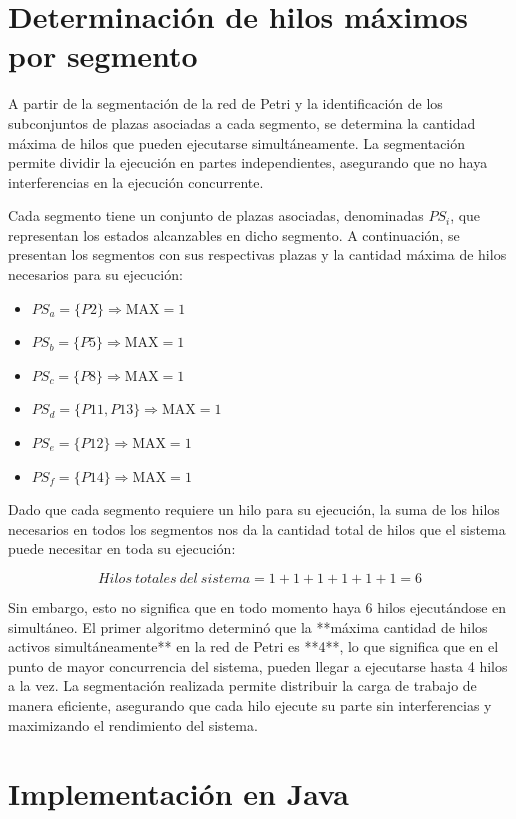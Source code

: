 \documentclass[12pt]{article}
\begin{document}
\section{Determinación de hilos máximos por segmento}

A partir de la segmentación de la red de Petri y la identificación de los subconjuntos de plazas asociadas a cada segmento, se determina la cantidad máxima de hilos que pueden ejecutarse simultáneamente. La segmentación permite dividir la ejecución en partes independientes, asegurando que no haya interferencias en la ejecución concurrente.

Cada segmento tiene un conjunto de plazas asociadas, denominadas \(PS_i\), que representan los estados alcanzables en dicho segmento. A continuación, se presentan los segmentos con sus respectivas plazas y la cantidad máxima de hilos necesarios para su ejecución:

\begin{itemize}
    \item \(PS_a = \{P2\} \Rightarrow \text{MAX} = 1\)
    \item \(PS_b = \{P5\} \Rightarrow \text{MAX} = 1\)
    \item \(PS_c = \{P8\} \Rightarrow \text{MAX} = 1\)
    \item \(PS_d = \{P11, P13\} \Rightarrow \text{MAX} = 1\)
    \item \(PS_e = \{P12\} \Rightarrow \text{MAX} = 1\)
    \item \(PS_f = \{P14\} \Rightarrow \text{MAX} = 1\)
\end{itemize}

Dado que cada segmento requiere un hilo para su ejecución, la suma de los hilos necesarios en todos los segmentos nos da la cantidad total de hilos que el sistema puede necesitar en toda su ejecución:

\[
Hilos\ totales\ del\ sistema = 1 + 1 + 1 + 1 + 1 + 1 = 6
\]

Sin embargo, esto no significa que en todo momento haya 6 hilos ejecutándose en simultáneo.  
El primer algoritmo determinó que la **máxima cantidad de hilos activos simultáneamente** en la red de Petri es **4**, lo que significa que en el punto de mayor concurrencia del sistema, pueden llegar a ejecutarse hasta 4 hilos a la vez.  
La segmentación realizada permite distribuir la carga de trabajo de manera eficiente, asegurando que cada hilo ejecute su parte sin interferencias y maximizando el rendimiento del sistema.

\section{Implementación en Java}
\end{document}

